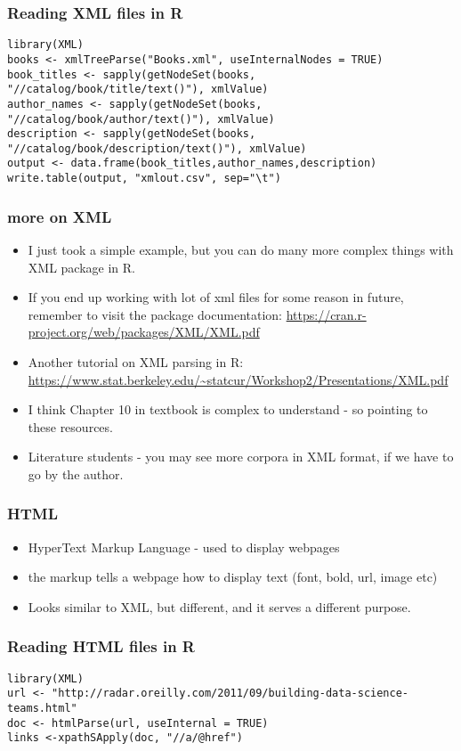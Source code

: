 \documentclass{beamer}
\begin{document}
\begin{frame}[fragile]
\frametitle{Reading XML files in R} \tiny
\begin{verbatim}
library(XML)
books <- xmlTreeParse("Books.xml", useInternalNodes = TRUE)
book_titles <- sapply(getNodeSet(books, "//catalog/book/title/text()"), xmlValue)
author_names <- sapply(getNodeSet(books, "//catalog/book/author/text()"), xmlValue)
description <- sapply(getNodeSet(books, "//catalog/book/description/text()"), xmlValue)
output <- data.frame(book_titles,author_names,description)
write.table(output, "xmlout.csv", sep="\t")
\end{verbatim}
\end{frame}

\begin{frame}
\frametitle{more on XML}
\begin{itemize}
\item I just took a simple example, but you can do many more complex things with XML package in R.
\item If you end up working with lot of xml files for some reason in future, remember to visit the package documentation: \url{https://cran.r-project.org/web/packages/XML/XML.pdf}
\item Another tutorial on XML parsing in R: \url{https://www.stat.berkeley.edu/~statcur/Workshop2/Presentations/XML.pdf}
\item I think Chapter 10 in textbook is complex to understand - so pointing to these resources.
\item Literature students - you may see more corpora in XML format, if we have to go by the author.
\end{itemize}
\end{frame}

\begin{frame}
\frametitle{HTML}
\begin{itemize}
\item HyperText Markup Language  - used to display webpages
\item the markup tells a webpage how to display text (font, bold, url, image etc)
\item Looks similar to XML, but different, and it serves a different purpose. 
\end{itemize}
\end{frame}

\begin{frame}[fragile]
\frametitle{Reading HTML files in R}
\tiny
\begin{verbatim}
library(XML)
url <- "http://radar.oreilly.com/2011/09/building-data-science-teams.html"
doc <- htmlParse(url, useInternal = TRUE)
links <-xpathSApply(doc, "//a/@href")
\end{verbatim}
\end{frame}
\end{document}

